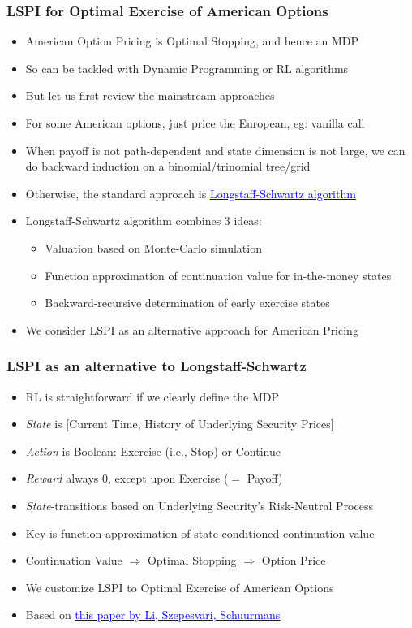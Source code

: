 \documentclass[handout]{beamer}
\begin{document}
\begin{frame}
\frametitle{LSPI for Optimal Exercise of American Options}
\pause
\begin{itemize}[<+->]
\item American Option Pricing is Optimal Stopping, and hence an MDP
\item So can be tackled with Dynamic Programming or RL algorithms
\item But let us first review the mainstream approaches
\item For some American options, just price the European, eg: vanilla call
\item When payoff is not path-dependent and state dimension is not large, we can do backward induction on a binomial/trinomial tree/grid
\item Otherwise, the standard approach is \href{https://people.math.ethz.ch/~hjfurrer/teaching/LongstaffSchwartzAmericanOptionsLeastSquareMonteCarlo.pdf}{\underline{\textcolor{blue}{Longstaff-Schwartz algorithm}}}
\item Longstaff-Schwartz algorithm combines 3 ideas:
\begin{itemize}
\item Valuation based on Monte-Carlo simulation
\item Function approximation of continuation value for in-the-money states
\item Backward-recursive determination of early exercise states
\end{itemize}
\item We consider LSPI as an alternative approach for American Pricing
\end{itemize}
\end{frame}

\begin{frame}
\frametitle{LSPI as an alternative to Longstaff-Schwartz}
\pause
\begin{itemize}[<+->]
\item RL is straightforward if we clearly define the MDP
\item {\em State} is [Current Time, History of Underlying Security Prices]
\item {\em Action} is Boolean: Exercise (i.e., Stop) or Continue
\item {\em Reward} always 0, except upon Exercise ($=$ Payoff)
\item {\em State}-transitions based on Underlying Security's Risk-Neutral Process
\item Key is function approximation of state-conditioned continuation value
\item Continuation Value $\Rightarrow$ Optimal Stopping $\Rightarrow$ Option Price
\item We customize LSPI to Optimal Exercise of American Options
\item Based on \href{http://proceedings.mlr.press/v5/li09d/li09d.pdf}{\underline{\textcolor{blue}{this paper by Li, Szepesvari, Schuurmans}}}
\end{itemize}
\end{frame}
\end{document}
